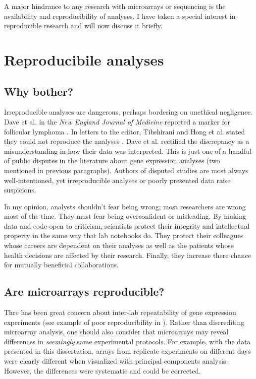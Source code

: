 A major hindrance to any 
research with microarrays or sequencing is the availability
and reproducibility of analyses. I have taken
a special interest in reproducible research and will now discuss it briefly.

\section{Reproducibile analyses}

\subsection{Why bother?}

Irreproducible analyses are dangerous, perhaps bordering on unethical negligence. 
Dave et al. in the \textit{New England
Journal of Medicine} reported a marker for follicular lymphoma \cite{Dave:2004vl}. 
In letters to the editor, Tibshirani and Hong et al. stated they 
could not reproduce the analyses \cite{Tibshirani:2005el}. 
Dave et al. rectified the discrepancy as a misunderstanding
in how their data was interpreted. This is just one of a handful of
public disputes in the literature about gene expression analyses (two mentioned
in previous paragraphs).
Authors of disputed studies are most always well-intentioned, yet 
irreproducible analyses or poorly presented data raise suspicions.

In my opinion, analysts shouldn't fear being wrong; most researchers
are wrong most of the time. They must fear being overconfident or misleading. 
By making data and code open to criticism,
scientists protect their integrity and intellectual property in the same
way that lab notebooks do. They protect their colleagues
whose careers are dependent on their analyses as well as the patients
whose health decisions are affected by their research.
Finally, they increase there chance for mutually beneficial collaborations.

\subsection{Are microarrays reproducible?}

Thre has been great concern about inter-lab repeatability of 
gene expression experiments
(see example of poor reproducibility in 
\cite{Evsikov:2003ic,Fortunel:2003eu,Ivanova:2003bh,RamalhoSantos:2002dy}). 
Rather than discrediting microarray analysis,
one should also consider that microarrays
may reveal differences in \textit{seemingly} same experimental protocols.
For example, with the data presented in this dissertation, arrays from
replicate experiments on different days were clearly different when
visualized with principal components analysis. However, the differences
were systematic and could be corrected.

